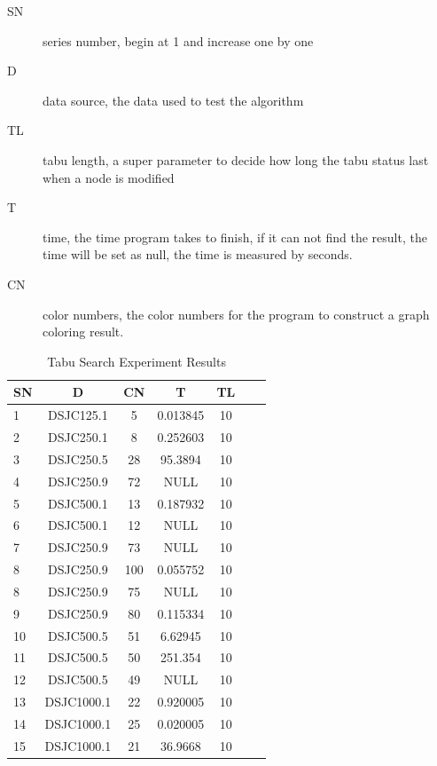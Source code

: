 \documentclass[10pt, a4paper, twocolumn]{article} %
\begin{document}
\begin{description}
	\item[SN] series number, begin at 1 and increase one by one
    \item[D] data source, the data used to test the algorithm
    \item[TL] tabu length, a super parameter to decide how long the tabu status
        last when a node is modified
    \item [T] time, the time program takes to finish, if it can not find the
        result, the time will be set as null, the time is measured by seconds.
    \item [CN] color numbers, the color numbers for the program to construct a
        graph coloring result.
\end{description}

\begin{table}
	\caption{Tabu Search Experiment Results}
	\centering
    \label{tabu:res}
    \begin{tabular}{l*{4}{c}r | p{1cm}}
        SN & D & CN & T & TL  \\
    \hline
    1 & DSJC125.1 &5 &   0.013845 & 10     \\
    2 & DSJC250.1 &8 &   0.252603 & 10    \\
    3 & DSJC250.5 &28 & 95.3894   & 10     \\
    4 & DSJC250.9 &72 & NULL   & 10    \\
    5 & DSJC500.1 &13 & 0.187932   & 10    \\
    6 & DSJC500.1 &12 & NULL   & 10    \\
    7 & DSJC250.9 &73 &  NULL  & 10    \\
    8 & DSJC250.9 &100 &  0.055752  & 10    \\
    8 & DSJC250.9 &75 &  NULL  & 10    \\
    9 & DSJC250.9 &80 &  0.115334  & 10    \\
    10 & DSJC500.5 &51 & 6.62945   & 10    \\
    11 & DSJC500.5 &50 & 251.354   & 10    \\
    12 & DSJC500.5 &49 & NULL   & 10    \\
    13 & DSJC1000.1 &22 & 0.920005   & 10    \\
    14 & DSJC1000.1 &25 & 0.020005   & 10    \\
    15 & DSJC1000.1 &21 & 36.9668   & 10    \\
    \end{tabular}
\end{table}
\end{document}
